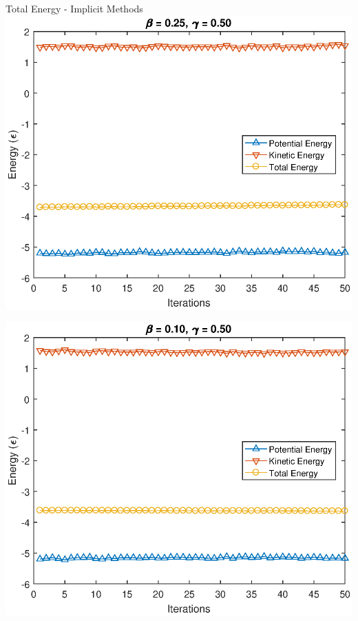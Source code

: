 \documentclass{beamer}
\begin{document}
\begin{frame}{Total Energy - Implicit Methods}
 {
		\centering
		\includegraphics[scale=0.60]{energy_b0,25_g0,50_long.eps}
}

 {
		\centering
		\includegraphics[scale=0.60]{energy_b0,10_g0,50_long.eps}
}


\end{frame}
\end{document}
